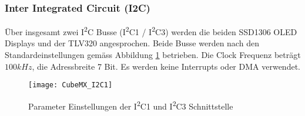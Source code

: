 \subsubsection{Inter Integrated Circuit (I2C)}
\label{sec:CubeMXI2C}

Über insgesamt zwei I\textsuperscript{2}C Busse (I\textsuperscript{2}C1 / I\textsuperscript{2}C3) werden die beiden SSD1306 OLED Displays und der TLV320 angesprochen.
Beide Busse werden nach den Standardeinstellungen gemäss Abbildung \ref{pic:CubeMX_I2C1} betrieben.
Die Clock Frequenz beträgt $100\si{kHz}$, die Adressbreite 7 Bit.
Es werden keine Interrupts oder DMA verwendet.

\begin{figure}[H]
	\centering
	\texttt{[image: CubeMX\_I2C1]}
	\caption{Parameter Einstellungen der I\textsuperscript{2}C1 und  I\textsuperscript{2}C3 Schnittstelle}
	\label{pic:CubeMX_I2C1}
\end{figure}




